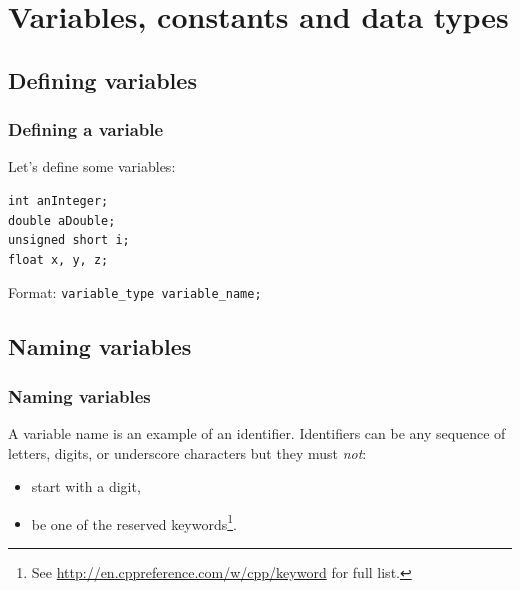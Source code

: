 \documentclass{beamer}
\begin{document}
\section{Variables, constants and data types}

\subsection{Defining variables}

\begin{frame}[fragile]
\frametitle{Defining a variable}
  Let's define some variables:
  \begin{lstlisting}
int anInteger;
double aDouble;
unsigned short i;
float x, y, z;
  \end{lstlisting}
Format: \texttt{\textcolor{bluekeywords}{variable\_type} variable\_name;}

\end{frame}

\subsection{Naming variables}

\begin{frame}
  \frametitle{Naming variables}
  
  A variable name is an example of an identifier.
  \pause
  Identifiers can be any sequence of letters, digits, or underscore characters but they must \emph{not}:
	\begin{itemize}
  	\item start with a digit,
	  \item be one of the reserved keywords\footnote{See \url{http://en.cppreference.com/w/cpp/keyword} for full list.}.
	\end{itemize}
	\pause
\end{frame}
\end{document}
